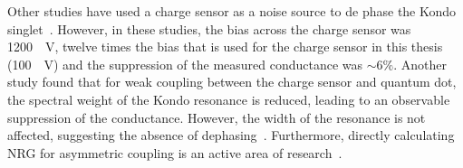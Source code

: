 Other studies have used a charge sensor as a noise source to de phase the Kondo singlet~\cite{kondo_controlled_dephasing}. However, in these studies, the bias across the charge sensor was \qty{1200}{\mu V}, twelve times the bias that is used for the charge sensor in this thesis (\qty{100}{\mu V}) and the suppression of the measured conductance was $\sim6\%$. 
Another study found that for weak coupling between the charge sensor and quantum dot, the spectral weight of the Kondo resonance is reduced, leading to an observable suppression of the conductance. However, the width of the resonance is not affected, suggesting the absence of dephasing~\cite{peculiar_dephasing_of_kondo}. Furthermore, directly calculating NRG for asymmetric coupling is an active area of research~\cite{kondo_nrg_asymmetric}.







